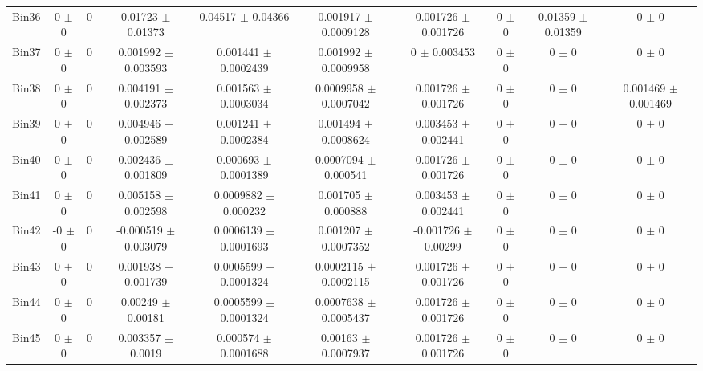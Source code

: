 \begin{tabular}{@{\extracolsep{4pt}}lccccccccc@{}}
     Bin36 & 0 $\pm$ 0 & 0 & 0.01723 $\pm$ 0.01373 & 0.04517 $\pm$ 0.04366 & 0.001917 $\pm$ 0.0009128 & 0.001726 $\pm$ 0.001726 & 0 $\pm$ 0 & 0.01359 $\pm$ 0.01359 & 0 $\pm$ 0 \\ 
     Bin37 & 0 $\pm$ 0 & 0 & 0.001992 $\pm$ 0.003593 & 0.001441 $\pm$ 0.0002439 & 0.001992 $\pm$ 0.0009958 & 0 $\pm$ 0.003453 & 0 $\pm$ 0 & 0 $\pm$ 0 & 0 $\pm$ 0 \\ 
     Bin38 & 0 $\pm$ 0 & 0 & 0.004191 $\pm$ 0.002373 & 0.001563 $\pm$ 0.0003034 & 0.0009958 $\pm$ 0.0007042 & 0.001726 $\pm$ 0.001726 & 0 $\pm$ 0 & 0 $\pm$ 0 & 0.001469 $\pm$ 0.001469 \\ 
     Bin39 & 0 $\pm$ 0 & 0 & 0.004946 $\pm$ 0.002589 & 0.001241 $\pm$ 0.0002384 & 0.001494 $\pm$ 0.0008624 & 0.003453 $\pm$ 0.002441 & 0 $\pm$ 0 & 0 $\pm$ 0 & 0 $\pm$ 0 \\ 
     Bin40 & 0 $\pm$ 0 & 0 & 0.002436 $\pm$ 0.001809 & 0.000693 $\pm$ 0.0001389 & 0.0007094 $\pm$ 0.000541 & 0.001726 $\pm$ 0.001726 & 0 $\pm$ 0 & 0 $\pm$ 0 & 0 $\pm$ 0 \\ 
     Bin41 & 0 $\pm$ 0 & 0 & 0.005158 $\pm$ 0.002598 & 0.0009882 $\pm$ 0.000232 & 0.001705 $\pm$ 0.000888 & 0.003453 $\pm$ 0.002441 & 0 $\pm$ 0 & 0 $\pm$ 0 & 0 $\pm$ 0 \\ 
     Bin42 & -0 $\pm$ 0 & 0 & -0.000519 $\pm$ 0.003079 & 0.0006139 $\pm$ 0.0001693 & 0.001207 $\pm$ 0.0007352 & -0.001726 $\pm$ 0.00299 & 0 $\pm$ 0 & 0 $\pm$ 0 & 0 $\pm$ 0 \\ 
     Bin43 & 0 $\pm$ 0 & 0 & 0.001938 $\pm$ 0.001739 & 0.0005599 $\pm$ 0.0001324 & 0.0002115 $\pm$ 0.0002115 & 0.001726 $\pm$ 0.001726 & 0 $\pm$ 0 & 0 $\pm$ 0 & 0 $\pm$ 0 \\ 
     Bin44 & 0 $\pm$ 0 & 0 & 0.00249 $\pm$ 0.00181 & 0.0005599 $\pm$ 0.0001324 & 0.0007638 $\pm$ 0.0005437 & 0.001726 $\pm$ 0.001726 & 0 $\pm$ 0 & 0 $\pm$ 0 & 0 $\pm$ 0 \\ 
     Bin45 & 0 $\pm$ 0 & 0 & 0.003357 $\pm$ 0.0019 & 0.000574 $\pm$ 0.0001688 & 0.00163 $\pm$ 0.0007937 & 0.001726 $\pm$ 0.001726 & 0 $\pm$ 0 & 0 $\pm$ 0 & 0 $\pm$ 0 \\ 
\hline\hline
  \end{tabular}

